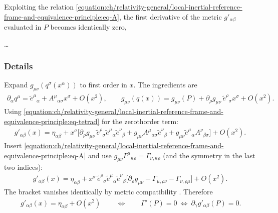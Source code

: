 \documentclass[letterpaper,10pt,english]{jupyterBook}
\begin{document}
\sphinxAtStartPar
Exploiting the relation \eqref{equation:ch/relativity-general/local-inertial-reference-frame-and-equivalence-principle:eq-A}, the first derivative of the metric \(g'_{\alpha \beta}\) evaluated in \(P\) becomes identically zero,

\sphinxAtStartPar
…
\subsubsection*{Details}

\sphinxAtStartPar
Expand \(g_{\mu \nu}(q^\sigma (x^\alpha))\) to first order in \(x\). The ingredients are
\begin{equation*}
\begin{split}
\partial_\alpha q^\mu=\tilde e^\mu{}_\alpha+A^\mu{}_{\alpha\sigma}x^\sigma+O(x^2),\qquad
g_{\mu\nu}(q(x))=g_{\mu\nu}(P)+\partial_\rho g_{\mu\nu}\,\tilde e^\rho{}_\sigma x^\sigma+O(x^2).
\end{split}
\end{equation*}
\sphinxAtStartPar
Using \eqref{equation:ch/relativity-general/local-inertial-reference-frame-and-equivalence-principle:eq-tetrad} for the zeroth\sphinxhyphen{}order term:
\begin{equation*}
\begin{split}
g'_{\alpha\beta}(x)=\eta_{\alpha\beta}+x^\sigma\Big[\partial_\rho g_{\mu\nu}\,\tilde e^\rho{}_\sigma\tilde e^\mu{}_\alpha\tilde e^\nu{}_\beta+g_{\mu\nu}A^\mu{}_{\alpha\sigma}\tilde e^\nu{}_\beta+g_{\mu\nu}\tilde e^\mu{}_\alpha A^\nu{}_{\beta\sigma}\Big]+O(x^2).
\end{split}
\end{equation*}
\sphinxAtStartPar
Insert \eqref{equation:ch/relativity-general/local-inertial-reference-frame-and-equivalence-principle:eq-A} and use \(g_{\mu\nu}\Gamma^\mu{}_{\kappa\rho}=\Gamma_{\nu,\kappa\rho}\) (and the symmetry in the last two indices):
\begin{equation*}
\begin{split}
g'_{\alpha\beta}(x)=\eta_{\alpha\beta}+x^\sigma\,\tilde e^\rho{}_\sigma\tilde e^\mu{}_\alpha\tilde e^\nu{}_\beta\Big[\partial_\rho g_{\mu\nu}-\Gamma_{\mu,\rho\nu}-\Gamma_{\nu,\rho\mu}\Big]+O(x^2).
\end{split}
\end{equation*}
\sphinxAtStartPar
The bracket vanishes identically by metric compatibility . Therefore
\begin{equation}\label{equation:ch/relativity-general/local-inertial-reference-frame-and-equivalence-principle:eq-second-order}
\begin{split}
\boxed{\,g'_{\alpha\beta}(x)=\eta_{\alpha\beta}+O(x^2)\,}\qquad\Longleftrightarrow\qquad \Gamma'(P)=0\ \Longleftrightarrow\ \partial_\gamma g'_{\alpha\beta}(P)=0 .
\end{split}
\end{equation}
\end{document}
